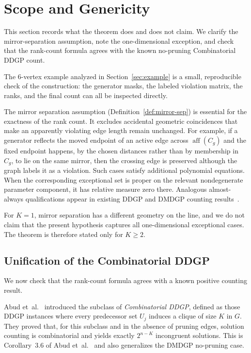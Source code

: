 \section{Scope and Genericity}
\label{sec:scope}

This section records what the theorem does and does not claim. We clarify the mirror-separation assumption, note the one-dimensional exception, and check that the rank-count formula agrees with the known no-pruning Combinatorial DDGP count.

The 6-vertex example analyzed in Section~\ref{sec:example} is a small, reproducible check of the construction: the generator masks, the labeled violation matrix, the ranks, and the final count can all be inspected directly.

The mirror separation assumption (Definition~\ref{def:mirror-sep}) is essential for the exactness of the rank count. It excludes accidental geometric coincidences that make an apparently violating edge length remain unchanged. For example, if a generator reflects the moved endpoint of an active edge across $\operatorname{aff}(C_g)$ and the fixed endpoint happens, by the chosen distances rather than by membership in $C_g$, to lie on the same mirror, then the crossing edge is preserved although the graph labels it as a violation. Such cases satisfy additional polynomial equations. When the corresponding exceptional set is proper on the relevant nondegenerate parameter component, it has relative measure zero there. Analogous almost-always qualifications appear in existing DDGP and DMDGP counting results~\cite{liberti2014number,abud2024impossible}.

For $K=1$, mirror separation has a different geometry on the line, and we do not claim that the present hypothesis captures all one-dimensional exceptional cases. The theorem is therefore stated only for $K \ge 2$.

\subsection{Unification of the Combinatorial DDGP}
\label{sec:combinatorial-ddgp}

We now check that the rank-count formula agrees with a known positive counting result. 

Abud et~al.~\cite{abud2024impossible} introduced the subclass of \emph{Combinatorial DDGP}, defined as those DDGP instances where every predecessor set $U_j$ induces a clique of size $K$ in $G$. They proved that, for this subclass and in the absence of pruning edges, solution counting is combinatorial and yields exactly $2^{n-K}$ incongruent solutions. This is Corollary~3.6 of Abud et~al.~\cite{abud2024impossible} and also generalizes the DMDGP no-pruning case.


